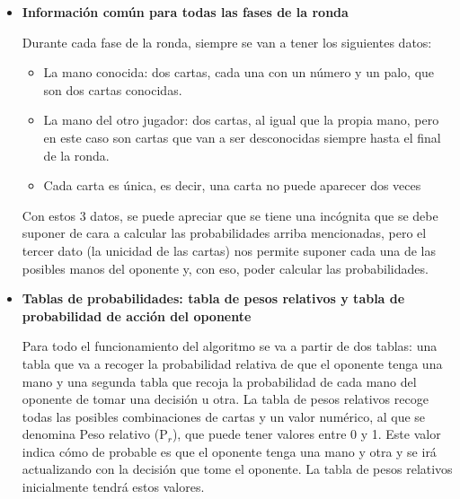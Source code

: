\begin{itemize}
\item \textbf{Información común para todas las fases de la ronda}

Durante cada fase de la ronda, siempre se van a tener los siguientes datos:
\begin{itemize}
\item La mano conocida: dos cartas, cada una con un número y un palo, que son dos cartas conocidas.
\item La mano del otro jugador: dos cartas, al igual que la propia mano, pero en este caso son cartas que van a ser desconocidas siempre hasta el final de la ronda. 
\item Cada carta es única, es decir, una carta no puede aparecer dos veces
\end{itemize} 
Con estos 3 datos, se puede apreciar que se tiene una incógnita que se debe suponer de cara a calcular las probabilidades arriba mencionadas, pero el tercer dato (la unicidad de las cartas) nos permite suponer cada una de las posibles manos del oponente y, con eso, poder calcular las probabilidades.

\item\textbf{Tablas de probabilidades: tabla de pesos relativos y tabla de probabilidad de acción del oponente}

Para todo el funcionamiento del algoritmo se va a partir de dos tablas: una tabla que va a recoger la probabilidad relativa de que el oponente tenga una mano y una segunda tabla que recoja la probabilidad de cada mano del oponente de tomar una decisión u otra.
La tabla de pesos relativos recoge todas las posibles combinaciones de cartas y un valor numérico, al que se denomina Peso relativo (P$_r$), que puede tener valores entre 0 y 1. Este valor indica cómo de probable es que el oponente tenga una mano y otra y se irá actualizando con la decisión que tome el oponente.
La tabla de pesos relativos inicialmente tendrá estos valores.



\end{itemize}
